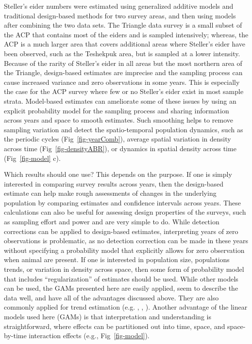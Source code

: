 \documentclass[
  10pt,
  letterpaper,
]{article}
\begin{document}
Steller's eider numbers were estimated using generalized additive models
and traditional design-based methods for two survey areas, and then
using models after combining the two data sets. The Triangle data survey
is a small subset of the ACP that contains most of the eiders and is
sampled intensively; whereas, the ACP is a much larger area that covers
additional areas where Steller's eider have been observed, such as the
Teshekpuk area, but is sampled at a lower intensity. Because of the
rarity of Steller's eider in all areas but the most northern area of the
Triangle, design-based estimates are imprecise and the sampling process
can cause increased variance and zero observations in some years. This
is especially the case for the ACP survey where few or no Steller's
eider exist in most sample strata. Model-based estimates can ameliorate
some of these issues by using an explicit probability model for the
sampling process and sharing information across years and space to
smooth estimates. Such smoothing helps to remove sampling variation and
detect the spatio-temporal population dynamics, such as the periodic
cycles (Fig~\ref{fig-yearComb}), average spatial variation in density
across time (Fig~\ref{fig-densityABR}), or dynamics in spatial density
across time (Fig~\ref{fig-model} c).

Which results should one use? This depends on the purpose. If one is
simply interested in comparing survey results across years, then the
design-based estimate can help make rough assessments of changes in the
underlying population by comparing estimates and confidence intervals
across years. These calculations can also be useful for assessing design
properties of the surveys, such as sampling effort and power and are
very simple to do. While detection corrections can be applied to
design-based estimates, interpreting years of zero observations is
problematic, as no detection correction can be made in these years
without specifying a probability model that explicitly allows for zero
observation when animal are present. If one is interested in population
size, populations trends, or variation in density across space, then
some form of probability model that includes ``regularization'' of
estimates should be used. While other models can be used, the GAMs
presented here are easily applied, seem to describe the data well, and
have all of the advantages discussed above. They are also commonly
applied for trend estimation (e.g. \citep{amundson2019},
\citep{rosenberg2019decline}, \citep{smith2021north}). Another advantage
of the linear models used here (GAMs) is that interpretation and
understanding is straightforward, where effects can be partitioned out
into time, space, and space-by-time interaction effects (e.g.,
Fig~\ref{fig-model}).
\end{document}
